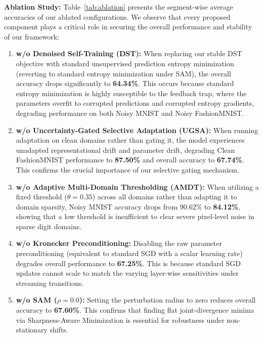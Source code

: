 \documentclass{article}
\theoremstyle{plain}
\theoremstyle{definition}
\theoremstyle{remark}
\begin{document}
\textbf{Ablation Study:} Table~\ref{tab:ablation} presents the segment-wise average accuracies of our ablated configurations. We observe that every proposed component plays a critical role in securing the overall performance and stability of our framework:
\begin{enumerate}
    \item \textbf{w/o Denoised Self-Training (DST):} When replacing our stable DST objective with standard unsupervised prediction entropy minimization (reverting to standard entropy minimization under SAM), the overall accuracy drops significantly to \textbf{64.34\%}. This occurs because standard entropy minimization is highly susceptible to the feedback trap, where the parameters overfit to corrupted predictions and corrupted entropy gradients, degrading performance on both Noisy MNIST and Noisy FashionMNIST.
    \item \textbf{w/o Uncertainty-Gated Selective Adaptation (UGSA):} When running adaptation on clean domains rather than gating it, the model experiences unadapted representational drift and parameter drift, degrading Clean FashionMNIST performance to \textbf{87.50\%} and overall accuracy to \textbf{67.74\%}. This confirms the crucial importance of our selective gating mechanism.
    \item \textbf{w/o Adaptive Multi-Domain Thresholding (AMDT):} When utilizing a fixed threshold ($\theta = 0.35$) across all domains rather than adapting it to domain sparsity, Noisy MNIST accuracy drops from $90.62\%$ to \textbf{84.12\%}, showing that a low threshold is insufficient to clear severe pixel-level noise in sparse digit domains.
    \item \textbf{w/o Kronecker Preconditioning:} Disabling the raw parameter preconditioning (equivalent to standard SGD with a scalar learning rate) degrades overall performance to \textbf{67.25\%}. This is because standard SGD updates cannot scale to match the varying layer-wise sensitivities under streaming transitions.
    \item \textbf{w/o SAM ($\rho = 0.0$):} Setting the perturbation radius to zero reduces overall accuracy to \textbf{67.60\%}. This confirms that finding flat joint-divergence minima via Sharpness-Aware Minimization is essential for robustness under non-stationary shifts.
\end{enumerate}
\end{document}
